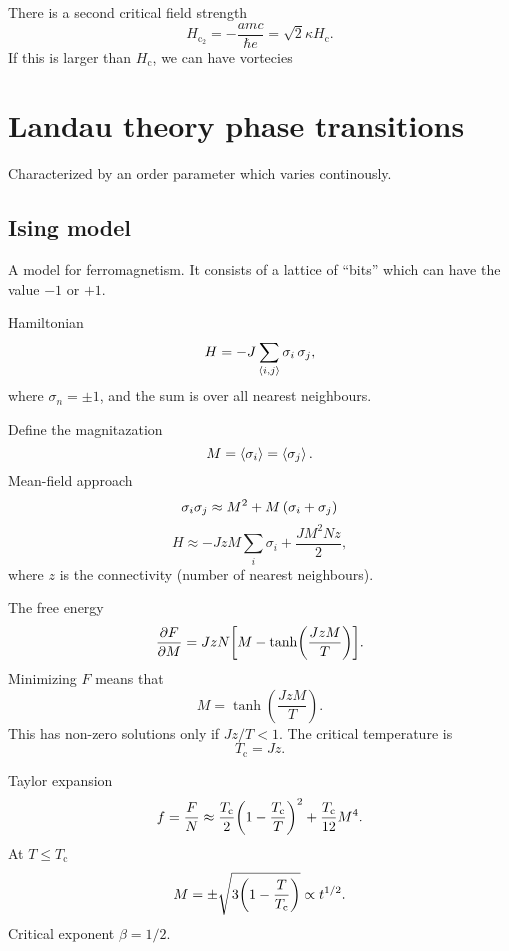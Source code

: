 \documentclass[11pt,letter, swedish, english, twocolumn
]{article}
\newcommand{\Tc}{\ensuremath{{T_{\text{c}}}}}
\newcommand{\Hc}{\ensuremath{{H_{\text{c}}}}}
\newcommand{\Hcc}{\ensuremath{{H_{\text{c}_2}}}}
\begin{document}
There is a second critical field strength
\begin{equation}
\Hcc =-\frac{amc}{\hbar e} = \sqrt{2}\kappa \Hc.
\end{equation}
If this is larger than $\Hc$, we can have vortecies

\section{Landau theory phase transitions}
Characterized by an order parameter which varies continously.
\subsection{Ising model}
A model for ferromagnetism. It consists of a lattice of ``bits'' which
can have the value $-1$ or $+1$.

Hamiltonian
\begin{equation}
H=-J\sum_{\ev{i,j}}\sigma_i\,\sigma_j,
\end{equation}
where $\sigma_n=\pm1$, and the sum is over all nearest neighbours. 

Define the magnitazation
\begin{equation}
M=\ev{\sigma_i}=\ev{\sigma_j}.
\end{equation}
Mean-field approach
\begin{equation}
\sigma_i\sigma_j\approx M^2+M\,\qty(\sigma_i+\sigma_j)
\end{equation}
\begin{equation}
H\approx -JzM\sum_i\sigma_i+\frac{JM^2Nz}{2},
\end{equation}
where $z$ is the connectivity (number of nearest neighbours).

The free energy
\begin{equation}
\pdv{F}{M}=JzN\qty[M-\tanh(\frac{JzM}{T})].
\end{equation}
Minimizing $F$ means that
\begin{equation}
M=\tanh(\frac{JzM}{T}).
\end{equation}
This has non-zero solutions only if $Jz/T<1$. The critical temperature
is
\begin{equation}
\Tc=Jz.
\end{equation}

Taylor expansion
\begin{equation}
f=\frac{F}{N}\approx \frac{\Tc}{2}\qty(1-\frac{\Tc}{T})^2
+\frac{\Tc}{12}M^4.
\end{equation}
At $T\le\Tc$
\begin{equation}
M=\pm\sqrt{3\qty(1-\frac{T}{\Tc})}\propto t^{1/2}.
\end{equation}
Critical exponent $\beta=1/2$.
\end{document}

